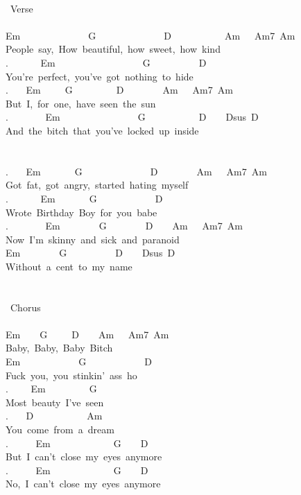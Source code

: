 {\\
\lbrack\ Verse\rbrack\\
\\
Em\ \ \ \ \ \ \ \ \ \ \ \ \ \ G\ \ \ \ \ \ \ \ \ \ \ \ \ \ D\ \ \ \ \ \ \ \ \ \ \ Am\ \ \ Am7\ Am\\
People\ say,\ \;How\ beautiful,\ how\ sweet,\ how\ kind\;\\
. \ \ \ \ \ \ Em\ \ \ \ \ \ \ \ \ \ \ \ \ \ \ \ \ \ G\ \ \ \ \ \ \ \ \ \ D\\
You're\ perfect,\ you've\ got\ nothing\ to\ hide\\
. \ \ \ Em\ \ \ \ \ G\ \ \ \ \ \ \ \ \ D\ \ \ \ \ \ \ \ Am\ \ \ Am7\ Am\\
But\ I,\ for\ one,\ have\ seen\ the\ sun\\
. \ \ \ \ \ \ \ Em\ \ \ \ \ \ \ \ \ \ \ \ \ \ \ \ G\ \ \ \ \ \ \ \ \ \ \ D\ \ \ \ Dsus\ D\\
And\ the\ bitch\ that\ you've\ locked\ up\ inside\\
\\
\\
. \ \ \ Em\ \ \ \ \ \ \ G\ \ \ \ \ \ \ \ \ \ \ \ \ \ D\ \ \ \ \ \ \ \ Am\ \ \ Am7\ Am\\
Got\ fat,\ got\ angry,\ started\ hating\ myself\\
. \ \ \ \ \ \ Em\ \ \ \ \ \ \ G\ \ \ \ \ \ \ \ \ \ \ \ D\\
Wrote\ \;Birthday\ Boy\;\ for\ you\ babe\\
. \ \ \ \ \ \ \ Em\ \ \ \ \ \ \ \ G\ \ \ \ \ \ \ \ D\ \ \ \ Am\ \ \ Am7\ Am\\
Now\ I'm\ skinny\ and\ sick\ and\ paranoid\\
Em\ \ \ \ \ \ \ \ G\ \ \ \ \ \ \ \ \ \ D\ \ \ \ Dsus\ D\\
Without\ a\ cent\ to\ my\ name\\
\\
\\
\lbrack\ Chorus\rbrack\\
\\
Em\ \ \ \ G\ \ \ \ \ D\ \ \ \ Am\ \ \ Am7\ Am\\
Baby,\ Baby,\ Baby\ Bitch\\
Em\ \ \ \ \ \ \ \ \ \ \ \ G\ \ \ \ \ \ \ \ \ \ \ \ D\\
Fuck\ you,\ you\ stinkin'\ ass\ ho\\
. \ \ \ \ Em\ \ \ \ \ \ \ \ \ G\\
Most\ beauty\ I've\ seen\\
. \ \ \ D\ \ \ \ \ \ \ \ \ \ \ Am\\
You\ come\ from\ a\ dream\\
. \ \ \ \ \ Em\ \ \ \ \ \ \ \ \ \ \ \ \ G\ \ \ \ D\\
But\ I\ can't\ close\ my\ eyes\ anymore\\
. \ \ \ \ \ Em\ \ \ \ \ \ \ \ \ \ \ \ \ G\ \ \ \ D\\
No,\ I\ can't\ close\ my\ eyes\ anymore\ \ }
